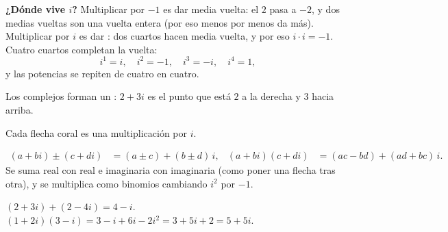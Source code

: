 \documentclass[11pt,a4paper]{article}
\DeclareMathOperator{\Ree}{Re}
\DeclareMathOperator{\Imm}{Im}
\begin{document}
\begin{minipage}[c]{0.52\linewidth}
\textbf{¿Dónde vive $i$?} Multiplicar por $-1$ es dar media vuelta: el $2$ pasa a $-2$, y dos medias vueltas son una
vuelta entera (por eso menos por menos da más). Multiplicar por $i$ es dar : dos cuartos
hacen media vuelta, y por eso $i\cdot i=-1$. Cuatro cuartos completan la vuelta:
\[ i^1=i,\quad i^2=-1,\quad i^3=-i,\quad i^4=1 , \]
y las potencias se repiten de cuatro en cuatro.

\smallskip
Los complejos forman un : $2+3i$ es el punto que está $2$ a la derecha y $3$ hacia arriba.
\end{minipage}\hfill
\begin{minipage}[c]{0.44\linewidth}\centering
{}

{\footnotesize\color{zmute}Cada flecha coral es una multiplicación por $i$.}
\end{minipage}

\begin{propiedad}[Operaciones]
\vspace{-4pt}
\begin{align*}
(a+bi)\pm(c+di)&=(a\pm c)+(b\pm d)\,i, & (a+bi)(c+di)&=(ac-bd)+(ad+bc)\,i .
\end{align*}
Se suma real con real e imaginaria con imaginaria (como poner una flecha tras otra), y se multiplica como binomios
cambiando $i^2$ por $-1$.
\end{propiedad}
\begin{ejemplo}
$(2+3i)+(2-4i)=4-i$.\qquad
$(1+2i)(3-i)=3-i+6i-2i^2=3+5i+2=5+5i$.
\end{ejemplo}
\end{document}
